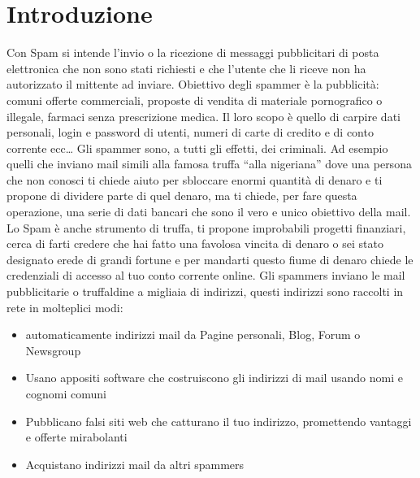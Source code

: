 \documentclass[12pt,a4paper]{article}
\begin{document}
\section{Introduzione}
Con Spam si intende l’invio o la ricezione di messaggi pubblicitari di posta elettronica che non sono stati richiesti e che l’utente che li riceve non ha autorizzato il mittente ad inviare.
\hfill \break \break
Obiettivo degli spammer è la pubblicità: comuni offerte commerciali, proposte di vendita di materiale pornografico o illegale, farmaci senza prescrizione medica. Il loro scopo è quello di carpire dati personali, login e password di utenti, numeri di carte di credito e di conto corrente ecc…
\hfill \break \break
Gli spammer sono, a tutti gli effetti, dei criminali. Ad esempio quelli che inviano mail simili alla famosa truffa “alla nigeriana” dove una persona che non conosci ti chiede aiuto per sbloccare enormi  quantità di denaro e ti propone di dividere parte di quel denaro, ma ti chiede, per fare questa operazione, una serie di dati bancari che sono il vero e unico obiettivo della mail.
\hfill \break \break
Lo Spam è anche strumento di truffa, ti propone improbabili progetti finanziari, cerca di farti credere che hai fatto una favolosa vincita di denaro o sei stato designato erede di grandi fortune e per mandarti questo fiume di denaro chiede  le credenziali di accesso al tuo conto corrente online.
\hfill \break \break
Gli spammers inviano le mail pubblicitarie o truffaldine a migliaia di indirizzi, questi indirizzi sono raccolti in rete in molteplici modi:
\begin{itemize}
    \item automaticamente indirizzi mail da Pagine personali, Blog, Forum o Newsgroup
\end{itemize}
\begin{itemize}
    \item Usano appositi software che costruiscono gli indirizzi di mail usando nomi e cognomi comuni
\end{itemize}
\begin{itemize}
    \item Pubblicano falsi siti web che catturano il tuo indirizzo, promettendo vantaggi e offerte mirabolanti
\end{itemize}
\begin{itemize}
    \item Acquistano indirizzi mail da altri spammers
\end{itemize}
\end{document}
